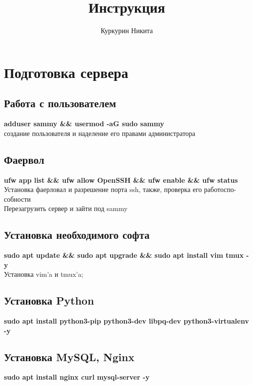 \documentclass[14pt,a4paper,oneside]{extarticle}
\title{Инструкция}
\author{Куркурин Никита}
\date{ }
\begin{document}
    \maketitle

    \renewcommand{\contentsname}{\center{Содержание}}\tableofcontents %

    \newpage

    \section{Подготовка сервера}

        \subsection{Работа с пользователем}
            \textbf{adduser sammy \&\& usermod -aG sudo sammy}\\
            создание пользователя и наделение его правами администратора

        \subsection{Фаервол}
            \textbf{ufw app list \&\& ufw allow OpenSSH \&\& ufw enable \&\& ufw status}\\
            Установка фаерловал и разрешение порта ssh, также, проверка его работоспо-\\собности\\

        \LARGE Перезагрузить сервер и зайти под sammy

        \normalsize
        \subsection{Установка необходимого софта}
            \textbf{sudo apt update \&\& sudo apt upgrade \&\& sudo apt install vim tmux -y} \\
            Установка vim'a и tmux'a;
        
        \subsection{Установка Python}
            \textbf{sudo apt install python3-pip python3-dev libpq-dev python3-virtualenv -y } \\
        
        \subsection{Установка MySQL, Nginx}
            \textbf{sudo apt install nginx curl mysql-server -y}
    
\end{document}
